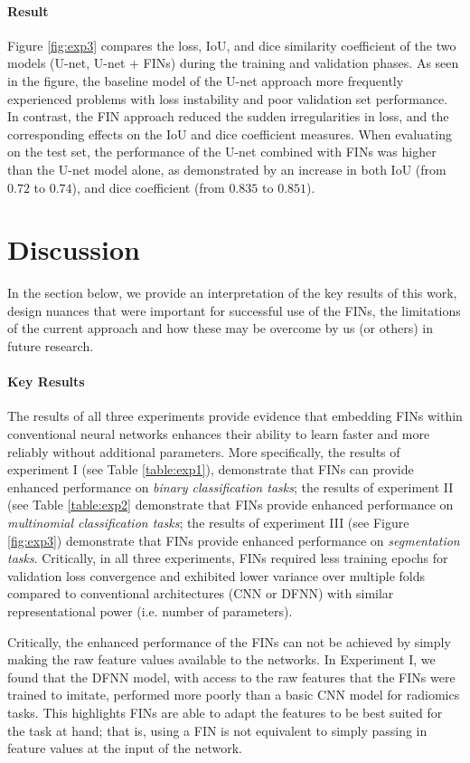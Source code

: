 \documentclass{article}
\begin{document}
\paragraph*{Result} Figure \ref{fig:exp3} compares the loss, IoU, and dice similarity coefficient of the two models (U-net, U-net + FINs) during the training and validation phases. As seen in the figure, the baseline model of the U-net approach more frequently experienced problems with loss instability and poor validation set performance. In contrast, the FIN approach reduced the sudden irregularities in loss, and the corresponding effects on the IoU and dice coefficient measures. When evaluating on the test set, the performance of the U-net combined with FINs was higher than the U-net model alone, as demonstrated by an increase in both IoU (from $0.72$ to $0.74$), and dice coefficient (from $0.835$ to $0.851$).

\section{Discussion} \label{sec:Disc}
In the section below, we provide an interpretation of the key results of this work, design nuances that were important for successful use of the FINs, the limitations of the current approach and how these may be overcome by us (or others) in future research. 

\paragraph*{Key Results} The results of all three experiments provide evidence that embedding FINs within conventional neural networks enhances their ability to learn faster and more reliably without additional parameters. More specifically, the results of experiment I (see Table \ref{table:exp1}), demonstrate that FINs can provide enhanced performance on \textit{binary classification tasks}; the results of experiment II (see Table \ref{table:exp2} demonstrate that FINs provide enhanced performance on \textit{multinomial classification tasks}; the results of experiment III (see Figure \ref{fig:exp3}) demonstrate that FINs provide enhanced performance on \textit{segmentation tasks}. Critically, in all three experiments, FINs required less training epochs for validation loss convergence and exhibited lower variance over multiple folds compared to conventional architectures (CNN or DFNN) with similar representational power (i.e. number of parameters).

Critically, the enhanced performance of the FINs can not be achieved by simply making the raw feature values available to the networks. In Experiment I, we found that the DFNN model, with access to the raw features that the FINs were trained to imitate, performed more poorly than a basic CNN model for radiomics tasks. This highlights FINs are able to adapt the features to be best suited for the task at hand; that is, using a FIN is not equivalent to simply passing in feature values at the input of the network. 
\end{document}
